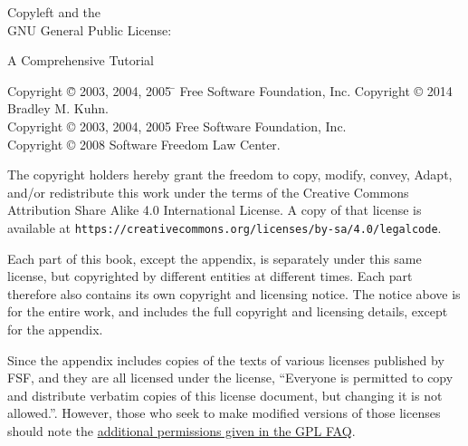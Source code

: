\documentclass[10pt, letterpaper]{book}
\begin{document}
\pagestyle{plain}

\frontmatter

\begin{titlepage}

\begin{center}

{\Huge
{\sc Copyleft and the  \\

GNU General Public License:

\vspace{.25in}

A Comprehensive Tutorial
}}
\vfill

{\parindent 0in
\begin{tabbing}
Copyright \= \copyright{} 2003, 2004, 2005 \= \hspace{.2in} Free Software Foundation, Inc. \kill 
Copyright \> \copyright{} 2014 \> \hspace{.2in} Bradley M. Kuhn. \\
Copyright \> \copyright{} 2003, 2004, 2005 \> \hspace{.2in} Free Software Foundation, Inc. \\
Copyright \> \copyright{} 2008 \> \hspace{.2in} Software Freedom Law Center. \\
\end{tabbing}
\vspace{.3in}

The copyright holders hereby grant the freedom to copy, modify, convey,
Adapt, and/or redistribute this work under the terms of the Creative Commons
Attribution Share Alike 4.0 International License.  A copy of that license is
available at \verb=https://creativecommons.org/licenses/by-sa/4.0/legalcode=.

Each part of this book, except the appendix, is separately under this same
license, but copyrighted by different entities at different times.  Each part
therefore also contains its own copyright and licensing notice.  The notice
above is for the entire work, and includes the full copyright and licensing
details, except for the appendix.

Since the appendix includes copies of the texts of various licenses published
by FSF, and they are all licensed under the license, ``Everyone is permitted
to copy and distribute verbatim copies of this license document, but changing
it is not allowed.''.  However, those who seek to make modified versions of
those licenses should note the
\href{https://www.gnu.org/licenses/gpl-faq.html#ModifyGPL}{additional
  permissions given in the GPL FAQ}.

}
\end{center}

\end{titlepage}
\end{document}
